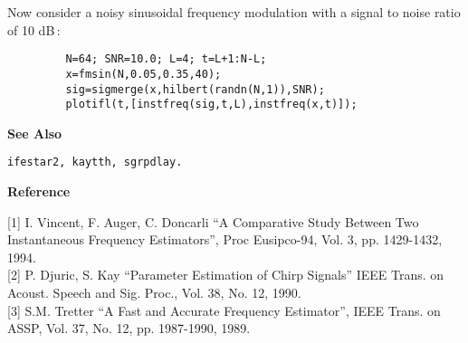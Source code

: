 \newpage

\begin{minipage}[t]{13.5cm}
Now consider a noisy sinusoidal frequency modulation with a signal to noise
ratio of 10 dB\,:
\begin{verbatim}
         N=64; SNR=10.0; L=4; t=L+1:N-L; 
         x=fmsin(N,0.05,0.35,40);
         sig=sigmerge(x,hilbert(randn(N,1)),SNR);
         plotifl(t,[instfreq(sig,t,L),instfreq(x,t)]); 
\end{verbatim}
\end{minipage}
\vspace*{.5cm}


{\bf \large {}\selectfont See Also}\\
\hspace*{1.5cm}
\begin{minipage}[t]{13.5cm}
\begin{verbatim}
ifestar2, kaytth, sgrpdlay.
\end{verbatim}
\end{minipage}
\vspace*{.5cm}


{\bf \large {}\selectfont Reference}\\
\hspace*{1.5cm}
\begin{minipage}[t]{13.5cm}
[1] I. Vincent, F. Auger, C. Doncarli ``A Comparative Study Between Two
Instantaneous Frequency Estimators'', Proc Eusipco-94, Vol. 3,
pp. 1429-1432, 1994.\\

[2] P. Djuric, S. Kay ``Parameter Estimation of Chirp Signals''
IEEE Trans. on Acoust. Speech and Sig. Proc., Vol. 38, No. 12, 1990.\\

[3] S.M. Tretter ``A Fast and Accurate Frequency Estimator'', IEEE
Trans. on ASSP, Vol. 37, No. 12, pp. 1987-1990, 1989.

\end{minipage}



